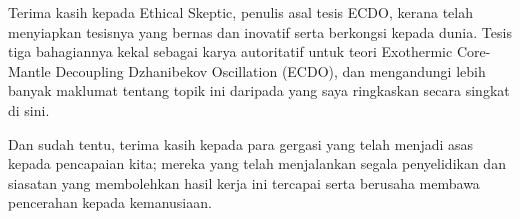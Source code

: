 \documentclass[10pt,twocolumn,letterpaper]{article}
\begin{document}
Terima kasih kepada Ethical Skeptic, penulis asal tesis ECDO, kerana telah menyiapkan tesisnya yang bernas dan inovatif serta berkongsi kepada dunia. Tesis tiga bahagiannya \cite{1} kekal sebagai karya autoritatif untuk teori Exothermic Core-Mantle Decoupling Dzhanibekov Oscillation (ECDO), dan mengandungi lebih banyak maklumat tentang topik ini daripada yang saya ringkaskan secara singkat di sini.

Dan sudah tentu, terima kasih kepada para gergasi yang telah menjadi asas kepada pencapaian kita; mereka yang telah menjalankan segala penyelidikan dan siasatan yang membolehkan hasil kerja ini tercapai serta berusaha membawa pencerahan kepada kemanusiaan.

\clearpage
\twocolumn

{\small
\renewcommand{\refname}{Rujukan}


}
\end{document}
